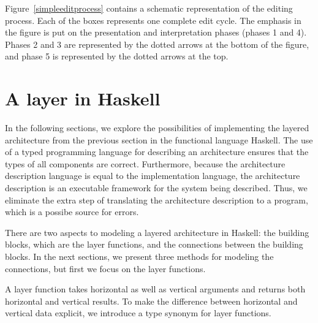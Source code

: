 \documentclass[preprint,natbib]{sigplanconf}
\begin{document}
% 



\bc
Figure~\ref{simpleeditprocess} contains a schematic representation of the editing process. Each of the boxes represents one complete edit cycle. The emphasis in the figure is put on the presentation and interpretation phases (phases 1 and 4). Phases 2 and 3 are represented by the dotted arrows at the bottom of the figure, and phase 5 is represented by the dotted arrows at the top.
\ec



%																
%																
%																
\section{A layer in Haskell} \label{sect:layerInHaskell}

In the following sections, we explore the possibilities of implementing the layered architecture from the previous section in the functional language Haskell. The use of a typed programming language for describing an architecture ensures that the types of all components are correct. Furthermore, because the architecture description language is equal to the implementation language, the architecture description is an executable framework for the system being described. Thus, we eliminate the extra step of translating the architecture description to a program, which is a possibe source for errors.


There are two aspects to modeling a layered architecture in Haskell: the building blocks, which are the layer functions, and the connections between the building blocks. In the next sections, we present three methods for modeling the connections, but first we focus on the layer functions. 

A layer function takes  horizontal as well as vertical arguments and returns both  horizontal and vertical results. To make the difference between horizontal and vertical data explicit, we introduce a type synonym for layer functions.
\end{document}

